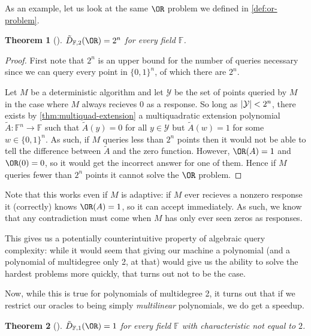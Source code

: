 \documentclass[english,12pt]{reedthesis}
\theoremstyle{plain}
\newtheorem{thm}{Theorem}[section]
\theoremstyle{definition}
\theoremstyle{remark}
\DeclarePairedDelimiter{\abs}{\lvert}{\rvert}
\begin{document}
As an example, let us look at the same $\OR$ problem we defined in
\cref{def:or-problem}.

\begin{thm}[{\cite[Thm.\ 4.4]{AW09}}]\label{thm:or-algebraic}
  $\tilde{D}_{\mathbb{F},2}(\OR) = 2^{n}$ for every field $\mathbb{F}$.
\end{thm}

\begin{proof}
  First note that $2^{n}$ is an upper bound for the number of queries necessary
  since we can query every point in $\{0, 1\}^{n}$, of which there are $2^{n}$.

  Let $M$ be a deterministic algorithm and let $\mathcal{Y}$ be the set of points queried
  by $M$ in the case where $M$ always recieves $0$ as a response. So long as
  $\abs{\mathcal{Y}} < 2^{n}$, there exists by \cref{thm:multiquad-extension} a
  multiquadratic extension polynomial $\tilde{A}: \mathbb{F}^{n} \rightarrow \mathbb{F}$
  such that $\tilde{A}(y) = 0$ for all $y \in \mathcal{Y}$ but $\tilde{A}(w) = 1$ for some
  $w \in \{0, 1\}^{n}$. As such, if $M$ queries less than $2^{n}$ points then it
  would not be able to tell the difference between $\tilde{A}$ and the zero
  function. However, $\OR(A) = 1$ and $\OR(0) = 0$, so it would get the
  incorrect answer for one of them. Hence if $M$ queries fewer than $2^{n}$
  points it cannot solve the $\OR$ problem.
\end{proof}

Note that this works even if $M$ is adaptive: if $M$ ever recieves a nonzero
response it (correctly) knows $\OR(A) = 1$, so it can accept immediately. As
such, we know that any contradiction must come when $M$ has only ever seen zeros
as responses.

This gives us a potentially counterintuitive property of algebraic query
complexity: while it would seem that giving our machine a polynomial (and a
polynomial of multidegree only 2, at that) would give us the ability to solve
the hardest problems more quickly, that turns out not to be the case.

Now, while this is true for polynomials of multidegree 2, it turns out that if
we restrict our oracles to being simply \emph{multilinear} polynomials, we do
get a speedup.

\begin{thm}[{\cite[Thm. 3]{JKRS09}}]\label{thm:or-multilinear}
  $\tilde{D}_{\mathbb{F},1}(\OR) = 1$ for every field $\mathbb{F}$ with
  characteristic not equal to $2$.
\end{thm}
\end{document}
